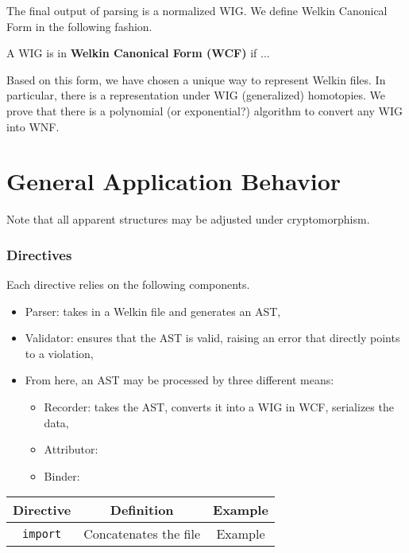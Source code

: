 The final output of parsing is a normalized WIG. We define Welkin Canonical Form in the following fashion.
\begin{definition}
A WIG is in \textbf{Welkin Canonical Form (WCF)} if ...
\end{definition}
Based on this form, we have chosen a unique way to represent Welkin files. In particular, there is a representation under WIG (generalized) homotopies. We prove that there is a polynomial (or exponential?) algorithm to convert any WIG into WNF.

\section{General Application Behavior}

Note that all apparent structures may be adjusted under cryptomorphism.
\subsubsection*{Directives}
Each directive relies on the following components.
\begin{itemize}
  \item Parser: takes in a Welkin file and generates an AST,
  \item Validator: ensures that the AST is valid, raising an error that directly points to a violation,
  \item From here, an AST may be processed by three different means:
		\begin{itemize}
		  \item Recorder: takes the AST, converts it into a WIG in WCF, serializes the data,
		  \item Attributor: %
		  \item Binder:
		\end{itemize}
\end{itemize}
\begin{center}
  \begin{tabular}{| c | c | c |}
	Directive & Definition & Example \\
	\hline
	\texttt{import} & Concatenates the file & Example

  \end{tabular}
\end{center}




